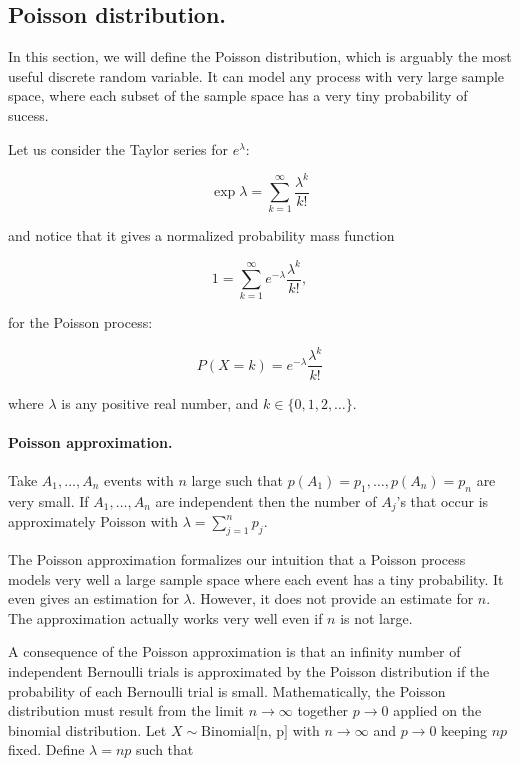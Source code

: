 \documentclass[12pt]{article}
\begin{document}
\subsection{Poisson distribution.}

In this section, we will define the Poisson distribution,
which is arguably the most useful discrete random variable.
It can model any process with very large sample space, where 
each subset of the sample space has a very tiny probability of sucess.

Let us consider the Taylor series for $e^{\lambda}$:

\begin{equation}
\exp{\lambda} = \sum_{k = 1}^{\infty} \frac{\lambda^{k}}{k !}
\end{equation}

\noindent
and notice that it gives a normalized probability mass function

\begin{equation}
1 = \sum_{k = 1}^{\infty} e^{-\lambda}  \frac{\lambda^{k}}{k !},
\end{equation}

\noindent
for the Poisson process:
	
\begin{equation}
P(X = k) = e^{-\lambda} \frac{\lambda^{k} }{k!}
\end{equation}

\noindent
where $\lambda$ is any positive real number, and $k \in \{0, 1, 2, \ldots \}$.

\paragraph{Poisson approximation.}
Take $A_{1}, \ldots, A_{n}$ events with $n$ large such that
$p(A_{1}) = p_{1}, \ldots, p(A_{n}) = p_{n}$ are very small.
If $A_{1}, \ldots, A_{n}$  are independent then the number of 
$A_{j}$'s that occur is approximately Poisson with 
$\lambda = \sum_{j = 1}^{n} p_{j}$.

\vspace{.5cm}
The Poisson approximation formalizes our intuition that a Poisson process
models very well a large sample space where each event has a tiny probability.
It even gives an estimation for $\lambda$.
However, it does not provide an estimate for $n$. The approximation actually works 
very well even if $n$ is not large.

A consequence of the Poisson approximation is that an infinity number of independent
Bernoulli trials is approximated by the Poisson distribution if the probability of 
each Bernoulli trial is small.
Mathematically, the Poisson distribution must result from the limit $n \to \infty$ 
together $p \to 0$ applied on the binomial distribution.
Let $X \sim \text{Binomial[n, p]}$ with $n \to \infty$ and $p \to 0$ keeping
$np$ fixed. Define $\lambda = np$ such that
\end{document}
